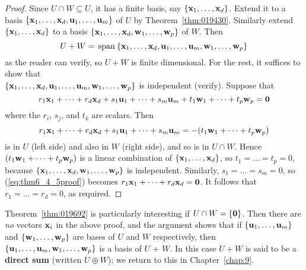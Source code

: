 \begin{proof}
Since $U \cap W \subseteq U$, it has a finite basis, say $\{\textbf{x}_{1}, \dots, \textbf{x}_{d}\}$. Extend it to a basis $\{\textbf{x}_{1}, \dots, \textbf{x}_{d}, \textbf{u}_{1}, \dots, \textbf{u}_{m}\}$ of $U$ by Theorem~\ref{thm:019430}. Similarly extend $\{\textbf{x}_{1}, \dots, \textbf{x}_{d}\}$ to a basis $\{\textbf{x}_{1}, \dots, \textbf{x}_{d}, \textbf{w}_{1}, \dots, \textbf{w}_{p}\}$ of $W$. Then
\begin{equation*}
U + W = \thinspace\operatorname{span\medspace}\{\textbf{x}_1, \dots, \textbf{x}_d, \textbf{u}_1, \dots, \textbf{u}_m, \textbf{w}_1, \dots, \textbf{w}_p \}
\end{equation*}
as the reader can verify, so $U + W$ is finite dimensional. For the rest, it suffices to show that \\$\{\textbf{x}_{1}, \dots, \textbf{x}_{d}, \textbf{u}_{1}, \dots, \textbf{u}_{m}, \textbf{w}_{1}, \dots, \textbf{w}_{p}\}$ is independent (verify). Suppose that
\begin{equation}
\label{eq:thm6_4_5proof}
r_1\textbf{x}_1 + \dots + r_d\textbf{x}_d + 
s_1\textbf{u}_1 + \dots + s_m\textbf{u}_m + 
t_1\textbf{w}_1 + \dots + t_p\textbf{w}_p = \textbf{0}
\end{equation}
where the $r_{i}$, $s_{j}$, and $t_{k}$ are scalars. Then
\begin{equation*}
r_1\textbf{x}_1 + \dots + r_d\textbf{x}_d + 
s_1\textbf{u}_1 + \dots + s_m\textbf{u}_m =
-(t_1\textbf{w}_1 + \dots + t_p\textbf{w}_p) 
\end{equation*}
is in $U$ (left side) and also in $W$ (right side), and so is in $U \cap W$. Hence $(t_{1}\textbf{w}_{1} + \dots + t_{p}\textbf{w}_{p})$ is a linear combination of $\{\textbf{x}_{1}, \dots, \textbf{x}_{d}\}$, so $t_{1} = \dots = t_{p} = 0$, because $\{\textbf{x}_{1}, \dots, \textbf{x}_{d}, \textbf{w}_{1}, \dots, \textbf{w}_{p}\}$ is independent. Similarly, $s_{1} = \dots = s_{m} = 0$, so (\ref{eq:thm6_4_5proof}) becomes $r_{1}\textbf{x}_{1} + \dots + r_{d}\textbf{x}_{d} = \textbf{0}$. It follows that $r_{1} = \dots = r_{d} = 0$, as required.
\end{proof}

Theorem~\ref{thm:019692} is particularly interesting if $U \cap W = \{\textbf{0}\}$. Then there are \textit{no} vectors $\textbf{x}_{i}$ in the above proof, and the argument shows that if $\{\textbf{u}_{1}, \dots, \textbf{u}_{m}\}$ and $\{\textbf{w}_{1}, \dots, \textbf{w}_{p}\}$ are bases of $U$ and $W$ respectively, then $\{\textbf{u}_{1}, \dots, \textbf{u}_{m}, \textbf{w}_{1}, \dots, \textbf{w}_{p}\}$ is a basis of $U$ + $W$. In this case $U + W$ is said to be a \textbf{direct sum} (written $U \oplus W$); we return to this in Chapter~\ref{chap:9}.

